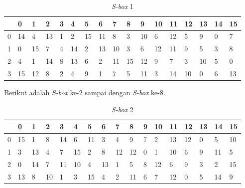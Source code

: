 \begin{enumerate}
\begin{table}
	\begin{center}
		\begin{tabular}{|l|l|l|l|l|l|l|l|l|l|l|l|l|l|l|l|l|}
				\hline
				& 0 & 1	& 2 & 3 & 4 & 5 & 6 & 7 & 8 & 9 & 10 & 11 & 12 & 13 & 14 & 15	\\ \hline
			0 & 14 & 4 & 13 & 1 & 2 & 15 & 11 & 8 & 3 & 10 & 6 & 12 & 5 & 9 & 0 & 7	\\ \hline
			1 & 0 & 15 & 7 & 4 & 14 & 2 & 13 & 10 & 3 & 6 & 12 & 11 & 9 & 5 & 3 & 8	\\ \hline
			2 & 4 & 1 & 14 & 8 & 13 & 6 & 2 & 11 & 15 & 12 & 9 & 7 & 3 & 10 & 5 & 0	\\ \hline
			3 & 15 & 12 & 8 & 2 & 4 & 9 & 1 & 7 & 5 & 11 & 3 & 14 & 10 & 0 & 6 & 13	\\ \hline
		\end{tabular}
	\end{center}
	\caption{\textit{S-box} 1}\label{table:s_box1}
\end{table}

Berikut adalah \textit{S-box} ke-2 sampai dengan \textit{S-box} ke-8.

\begin{table}
	\begin{center}
		\begin{tabular}{|l|l|l|l|l|l|l|l|l|l|l|l|l|l|l|l|l|}
				\hline
				& 0 & 1	& 2 & 3 & 4 & 5 & 6 & 7 & 8 & 9 & 10 & 11 & 12 & 13 & 14 & 15	\\ \hline
			0 & 15 & 1 & 8 & 14 & 6 & 11 & 3 & 4 & 9 & 7 & 2 & 13 & 12 & 0 & 5 & 10	\\ \hline
			1 & 3 & 13 & 4 & 7 & 15 & 2 & 8 & 12 & 12 & 0 & 1 & 10 & 6 & 9 & 11 & 5	\\ \hline
			2 & 0 & 14 & 7 & 11 & 10 & 4 & 13 & 1 & 5 & 8 & 12 & 6 & 9 & 3 & 2 & 15	\\ \hline
			3 & 13 & 8 & 10 & 1 & 3 & 15 & 4 & 2 & 11 & 6 & 7 & 12 & 0 & 5 & 14 & 9	\\ \hline
		\end{tabular}
	\end{center}
	\caption{\textit{S-box} 2}\label{table:s_box2}
\end{table}


\end{enumerate}
